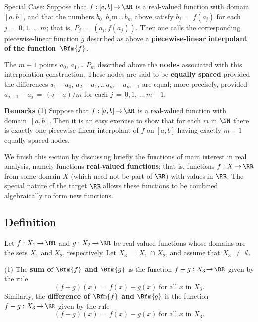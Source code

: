        \underline{Special Case}: Suppose that $f:[a,b] \,{\rightarrow}\, {\RR}$ is a real-valued function with domain $[a,b]$,
    and that the numbers $b_{0}$, $b_{1}$m\,{\ldots}\,$b_{m}$ above satisfy $b_{j} \,=\, f(a_{j})$ for each $j \,=\, 0,1,\,{\ldots}\,m$;
    that is, $P_{j} \,=\, (a_{j}, f(a_{j}))$. Then one calls the corresponding piecewise-linear function $g$
    described as above a {\bf piecewise-linear interpolant of the function~$\Bfm{f}$}.

        The $m+1$ points $a_{0}$, $a_{1}$,\,{\ldots}\,$P_{m}$ described above the {\bf nodes} 
    associated with this interpolation construction. These nodes are said to be {\bf equally spaced}
    provided the differences $a_{1}-a_{0}$, $a_{2}-a_{1}$,\,{\ldots}\,$a_{m}-a_{m-1}$ are equal;
    more precisely, provided $a_{j+1}-a_{j} \,=\, (b-a)/m$ for each $j \,=\, 0,1,\,{\ldots}\,m-1$.

        {\bf Remarks} (1) Suppose that $f:[a,b] \,{\rightarrow}\, {\RR}$ is a real-valued function with domain~$[a,b]$.
    Then it is an easy exercise to show that for each $m$ in ${\NN}$ there is exactly one piecewise-linear interpolant
    of $f$ on $[a,b]$ having exactly $m+1$ equally spaced nodes.

\V
\V

        We finish this section by discussing briefly the functions of main interest in real analysis, namely functions {\bf real-valued functions};
    that is, functions $f:X \,{\rightarrow}\, {\RR}$ from some domain $X$ (which need not be part of ${\RR}$) with values in ${\RR}$.
    The special nature of the target ${\RR}$  allows these functions to be combined algebraically to form new functions.

\V

        \subsection{\small{{\bf Definition}}}
        \label{DefA30.200}

        Let $f:X_{1} \,{\rightarrow}\, {\RR}$ and $g:X_{2} \,{\rightarrow}\, {\RR}$ be real-valued functions whose domains are the sets $X_{1}$ and $X_{2}$, respectively.
    Let $X_{3} \,=\, X_{1}\,{\cap}\,X_{2}$, and assume that $X_{3} \,\,{\neq}\,\, {\emptyset}$.

\V

        (1) The {\bf sum of $\Bfm{f}$ and $\Bfm{g}$} is the function $f+g:X_{3} \,{\rightarrow}\, {\RR}$ given by the rule
        \begin{displaymath}
        (f+g)(x) \,=\, f(x)+g(x) \mbox{ for all $x$ in $X_{3}$}.
        \end{displaymath}
    Similarly, the {\bf difference of $\Bfm{f}$ and $\Bfm{g}$} is the function $f-g:X_{3} \,{\rightarrow}\, {\RR}$ given by the rule
        \begin{displaymath}
        (f-g)(x) \,=\, f(x) - g(x) \mbox{ for all $x$ in $X_{3}$}.
        \end{displaymath}

